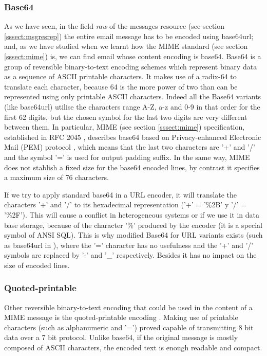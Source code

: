 \subsubsection{Base64} \label{sssect:base64}
As we have seen, in the field \textit{raw} of the messages resource (see section \ref{sssect:msgresrep}) the entire email message has to be encoded using base64url; and, as we have studied when we learnt how the MIME standard (see section \ref{sssect:mime}) is, we can find email whose content encoding is base64. Base64 \citep{wikibase64, rfc4648} is a group of reversible binary-to-text encoding schemes which represent binary data as a sequence of ASCII printable characters. It makes use of a radix-64 to translate each character, because 64 is the more power of two than can be represented using only printable ASCII characters. Indeed all the Base64 variants (like base64url) utilise the characters range A-Z, a-z and 0-9 in that order for the first 62 digits, but the chosen symbol for the last two digits are very different between them. In particular, MIME (see section \ref{sssect:mime}) specification, established in RFC 2045 \citep{rfc2045}, describes base64 based on  Privacy-enhanced Electronic Mail (PEM) protocol \citep{wikipem, rfc7468}, which means that the last two characters are '+' and '/' and the symbol '=' is used for output padding suffix. In the same way, MIME does not stablish a fixed size for the base64 encoded lines, by contrast it specifies a maximum size of 76 characters.

If we try to apply standard base64 in a URL encoder, it will translate the characters '+' and '/' to its hexadecimal representation ('+' = '\%2B' y '/' = '\%2F'). This will cause a conflict in heterogeneous systems or if we use it in data base storage, because of the character '\%' produced by the encoder (it is a special symbol of ANSI SQL). This is why modified Base64 for URL variants exists (such as base64url in \cite{rfc4648}), where the '=' character has no usefulness and the '+' and '/' symbols are replaced by '-' and '\_' respectively. Besides it has no impact on the size of encoded lines.

\subsubsection{Quoted-printable} \label{sssect:quot-p}
Other reversible binary-to-text encoding that could be used in the content of a MIME message is the quoted-printable encoding \citep{wikiquotprint, rfc1521}. Making use of printable characters (such as alphanumeric and '=') proved capable of transmitting 8 bit data over a 7 bit protocol. Unlike base64, if the original message is mostly composed of ASCII characters, the encoded text is enough readable and compact.

